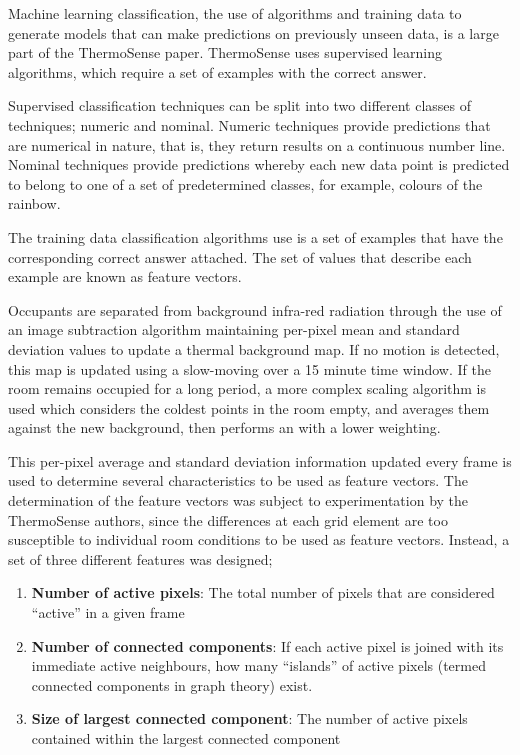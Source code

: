 \documentclass[../thesis/thesis.tex]{subfiles}
\begin{document}
Machine learning classification, the use of algorithms and training data to generate models that can make predictions on previously unseen data, is a large part of the ThermoSense paper. ThermoSense uses supervised learning algorithms, which require a set of examples with the correct answer.

Supervised classification techniques can be split into two different classes of techniques; numeric and nominal. Numeric techniques provide predictions that are numerical in nature, that is, they return results on a continuous number line. Nominal techniques provide predictions whereby each new data point is predicted to belong to one of a set of predetermined classes, for example, colours of the rainbow.

The training data classification algorithms use is a set of examples that have the corresponding correct answer attached. The set of values that describe each example are known as feature vectors.

Occupants are separated from background infra-red radiation through the use of an image subtraction algorithm maintaining per-pixel mean and standard deviation values to update a thermal background map. If no motion is detected, this map is updated using a slow-moving \emwa over a 15 minute time window. If the room remains occupied for a long period, a more complex scaling algorithm is used which considers the coldest points in the room empty, and averages them against the new background, then performs an \emwa with a lower weighting.

This per-pixel average and standard deviation information updated every frame is used to determine several characteristics to be used as feature vectors. The determination of the feature vectors was subject to experimentation by the ThermoSense authors, since the differences at each grid element are too susceptible to individual room conditions to be used as feature vectors. Instead, a set of three different features was designed;

\begin{enumerate}
\item \textbf{Number of active pixels}: The total number of pixels that are considered ``active'' in a given frame
\item \textbf{Number of connected components}: If each active pixel is joined with its immediate active neighbours, how many ``islands'' of active pixels (termed connected components in graph theory) exist.
\item \textbf{Size of largest connected component}: The number of active pixels contained within the largest connected component
\end{enumerate}
\end{document}
